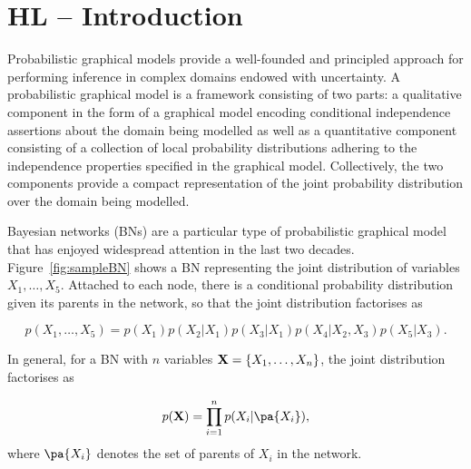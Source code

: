 \section{HL -- Introduction}



Probabilistic graphical models provide a well-founded and principled approach for performing inference 
in complex domains endowed with uncertainty. A probabilistic graphical model is a framework consisting 
of two parts: a qualitative component in the form of a graphical model encoding conditional independence 
assertions about the domain being modelled as well as a quantitative component consisting of a collection of local 
probability distributions adhering to the independence properties specified in the graphical model. Collectively, the 
two components provide a compact representation of the joint probability distribution over the domain being modelled. 

Bayesian networks (BNs) \cite{Pearl88} are a particular type of
probabilistic graphical model that has enjoyed widespread attention in
the last two decades. Figure~\ref{fig:sampleBN} shows a BN representing
the joint distribution of variables $X_1,\ldots,X_5$. Attached to each node, there is a conditional probability
distribution given its parents in the network, so that the joint distribution factorises as

\[
p(X_1,\ldots,X_5) = p(X_1) p(X_2|X_1) p(X_3|X_1) p(X_4|X_2,X_3) p(X_5|X_3).
\]

In general, for a BN with $n$ variables $\bX=\{X_1,\ldots,X_n\}$, the joint distribution factorises as

\begin{equation}
\label{equ:factorisation}
p(\bX) = \prod_{i=1}^n p(X_i|\pa{X_i}) ,
\end{equation}
where $\pa{X_i}$ denotes the set of parents of $X_i$ in the network. 


\newcommand{\simpleModel}{    
      \node[obs] (X1) {$X_1$};
      \node[obs] (X2) [below left of=X1, xshift=-1.2cm, yshift=-1.2cm] {$X_2$};
      \node[obs] (X3) [below right of=X1, xshift=+1.2cm, yshift=-1.2cm] {$X_3$};
      \node[obs] (X4) [below right of=X2, xshift=+1.2cm, yshift=-1.2cm] {$X_4$};
      \node[obs] (X5) [below right of=X3, xshift=+1.2cm, yshift=-1.2cm] {$X_5$};
      \edge{X1}{X2};
      \edge{X1}{X3};
      \edge{X2,X3}{X4};
      \edge{X3}{X5};
    }
    
